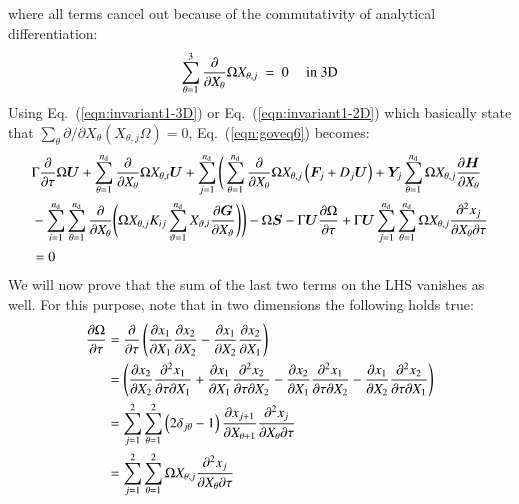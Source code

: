 \documentclass{warpdoc}
\newcommand{\alb}{\vspace{0.2cm}\\} %
\newcommand{\nd}{{{n}_{\rm d}}}
\newcommand{\mfd}{\displaystyle}
\renewcommand{\vec}[1]{\bm{#1}}
\begin{document}
%
where all terms cancel out because of the commutativity
of analytical differentiation:
%
\begin{equation}
  \sum_{\theta=1}^3   \frac{\partial}{\partial X_\theta}\Omega X_{\theta,j} 
  ~=~0 {\rm ~~~~~in~3D}
  \label{eqn:invariant1-3D}
\end{equation}
%
Using Eq.\ (\ref{eqn:invariant1-3D}) or Eq.\ 
(\ref{eqn:invariant1-2D}) which basically state that
$\sum_\theta \partial/\partial X_{\theta} ( X_{\theta,j} \Omega)=0$,
Eq.\  (\ref{eqn:goveq6}) becomes:
%
\begin{align}
    \mfd&\Gamma \frac{\partial }{\partial \tau} \Omega\vec{U}
     + \sum_{\theta=1}^\nd  \frac{\partial }{\partial X_\theta} \Omega X_{\theta,t} \vec{U}
    + \sum_{j=1}^\nd \Bigg( \sum_{\theta=1}^\nd \frac{\partial}{\partial X_\theta} \Omega X_{\theta,j} \left(\vec{F}_j+D_j \vec{U}\right)+\vec{Y}_j  \sum_{\theta=1}^\nd \Omega X_{\theta,j}\frac{\partial \vec{H}}{\partial X_\theta}
     \nonumber\alb
    &- \sum_{i=1}^\nd \sum_{\theta=1}^\nd   \frac{\partial}{\partial X_\theta}
       \Bigg( \Omega X_{\theta,j} K_{ij} \sum_{\vartheta=1}^\nd X_{\vartheta,i}\frac{\partial \vec{G}}{\partial X_\vartheta} \Bigg)\Bigg)
    - \Omega\vec{S} 
    -\Gamma \vec{U} \frac{\partial \Omega}{\partial \tau} 
+ \Gamma \vec{U} \mfd\sum_{j=1}^\nd \sum_{\theta=1}^\nd \Omega{X_{\theta,j}} \frac{\partial^2 x_j}{\partial X_\theta \partial \tau} \nonumber\alb
   &=0
 \label{eqn:goveq7}
\end{align}
%
We will now prove that the sum of the
last two terms on the LHS vanishes as well. For this purpose, note that in two dimensions the following holds true:
%
\begin{align}
   \frac{\partial \Omega}{\partial \tau}
  &=\frac{\partial}{\partial \tau}
   \left(
       \frac{\partial x_1}{\partial X_1} \frac{\partial x_2}{\partial X_2}
      -\frac{\partial x_1}{\partial X_2} \frac{\partial x_2}{\partial X_1}
   \right)\alb\mfd
  &=\left(
       \frac{\partial x_2}{\partial X_2} \frac{\partial^2 x_1}{\partial \tau \partial X_1}
      +\frac{\partial x_1}{\partial X_1} \frac{\partial^2 x_2}{\partial \tau \partial X_2}
      -\frac{\partial x_2}{\partial X_1} \frac{\partial^2 x_1}{\partial \tau \partial X_2}
      -\frac{\partial x_1}{\partial X_2} \frac{\partial^2 x_2}{\partial \tau \partial X_1}
   \right)\alb\mfd
  &= \sum_{j=1}^2 \sum_{\theta=1}^{2} \left(2\delta_{j \theta}-1\right)
     \frac{\partial x_{j+1}}{\partial X_{\theta+1}}\frac{\partial^2 x_j}{\partial X_\theta \partial \tau}\alb\mfd
  &= \sum_{j=1}^2 \sum_{\theta=1}^{2} \Omega X_{\theta,j}
     \frac{\partial^2 x_j}{\partial X_\theta \partial \tau}
\end{align}
\end{document}
